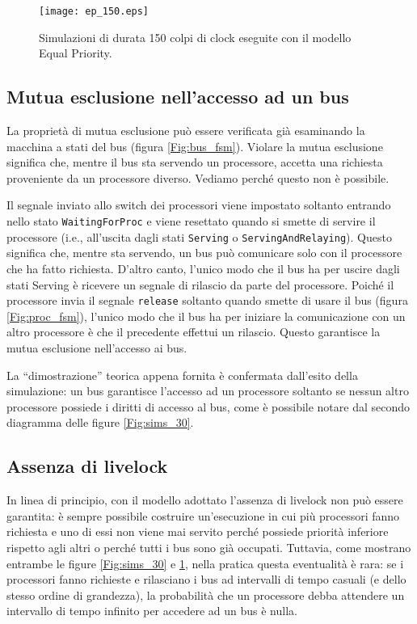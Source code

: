 \begin{figure}
\centering
\vspace{-2.8cm}
\texttt{[image: ep\_150.eps]}
\vspace{-2.8cm}
\caption{Simulazioni di durata 150 colpi di clock eseguite con il modello Equal Priority.}
\label{Fig:sim_150}
\end{figure}

\subsection{Mutua esclusione nell'accesso ad un bus}
La proprietà di mutua esclusione può essere verificata già esaminando la macchina a stati del bus (figura \ref{Fig:bus_fsm}). Violare la mutua esclusione significa che, mentre il bus sta servendo un processore, accetta una richiesta proveniente da un processore diverso. Vediamo perché questo non è possibile.

Il segnale inviato allo switch dei processori viene impostato soltanto entrando nello stato \texttt{WaitingForProc} e viene resettato quando si smette di servire il processore (i.e., all'uscita dagli stati \texttt{Serving} o \texttt{ServingAndRelaying}). Questo significa che, mentre sta servendo, un bus può comunicare solo con il processore che ha fatto richiesta. D'altro canto, l'unico modo che il bus ha per uscire dagli stati Serving è ricevere un segnale di rilascio da parte del processore. Poiché il processore invia il segnale \texttt{release} soltanto quando smette di usare il bus (figura \ref{Fig:proc_fsm}), l'unico modo che il bus ha per iniziare la comunicazione con un altro processore è che il precedente effettui un rilascio. Questo garantisce la mutua esclusione nell'accesso ai bus.

La \textquotedblleft dimostrazione\textquotedblright{} teorica appena fornita è confermata dall'esito della simulazione: un bus garantisce l'accesso ad un processore soltanto se nessun altro processore possiede i diritti di accesso al bus, come è possibile notare dal secondo diagramma delle figure \ref{Fig:sims_30}.

\subsection{Assenza di livelock}
In linea di principio, con il modello adottato l'assenza di livelock non può essere garantita: è sempre possibile costruire un'esecuzione in cui più processori fanno richiesta e uno di essi non viene mai servito perché possiede priorità inferiore rispetto agli altri o perché tutti i bus sono già occupati. Tuttavia, come mostrano entrambe le figure \ref{Fig:sims_30} e \ref{Fig:sim_150}, nella pratica questa eventualità è rara: se i processori fanno richieste e rilasciano i bus ad intervalli di tempo casuali (e dello stesso ordine di grandezza), la probabilità che un processore debba attendere un intervallo di tempo infinito per accedere ad un bus è nulla.

